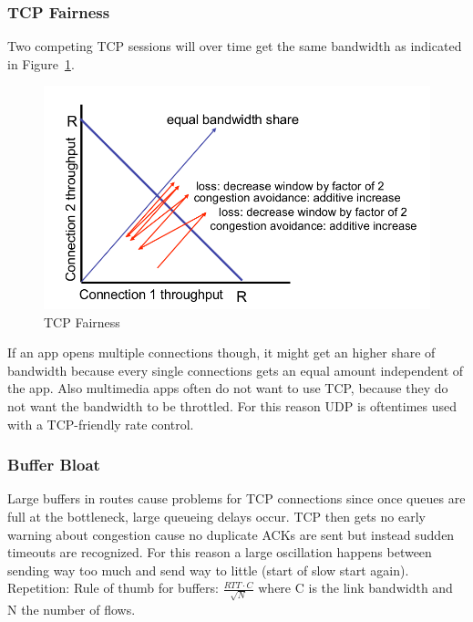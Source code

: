 \subsubsection*{TCP Fairness}
Two competing TCP sessions will over time get the same bandwidth as indicated in Figure~\ref{fig:tcp_fairness}.
\begin{figure}[h]
  \centering
  \includegraphics[width=.6\textwidth]{figures/tcp_fairness.png}
  \caption{TCP Fairness}\label{fig:tcp_fairness}
\end{figure}
If an app opens multiple connections though, it might get an higher share of bandwidth because every single connections gets an equal amount independent of the app.
Also multimedia apps often do not want to use TCP, because they do not want the bandwidth to be throttled.
For this reason UDP is oftentimes used with a TCP-friendly rate control.

\subsubsection*{Buffer Bloat}
Large buffers in routes cause problems for TCP connections since once queues are full at the bottleneck, large queueing delays occur.
TCP then gets no early warning about congestion cause no duplicate ACKs are sent but instead sudden timeouts are recognized.
For this reason a large oscillation happens between sending way too much and send way to little (start of slow start again).
Repetition: Rule of thumb for buffers: $\frac{RTT \cdot C}{\sqrt{N}}$ where C is the link bandwidth and N the number of flows.
